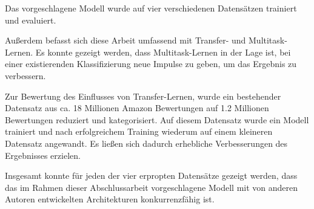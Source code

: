 Das vorgeschlagene Modell wurde auf vier verschiedenen Datensätzen trainiert und evaluiert.
\medskip

Außerdem befasst sich diese Arbeit umfassend mit Transfer- und Multitask-Lernen. Es konnte gezeigt werden, dass Multitask-Lernen in der Lage ist, bei einer existierenden Klassifizierung neue Impulse zu geben, um das Ergebnis zu verbessern. 

Zur Bewertung des Einflusses von Transfer-Lernen, wurde ein bestehender Datensatz aus ca. 18 Millionen Amazon Bewertungen auf 1.2 Millionen Bewertungen reduziert und kategorisiert. Auf diesem Datensatz wurde ein Modell trainiert und nach erfolgreichem Training wiederum auf einem kleineren Datensatz angewandt. Es ließen sich dadurch erhebliche Verbesserungen des Ergebnisses erzielen.
\medskip

 Insgesamt konnte für jeden der vier erpropten Datensätze gezeigt werden, dass das im Rahmen dieser Abschlussarbeit vorgeschlagene Modell mit von anderen Autoren entwickelten Architekturen konkurrenzfähig ist.
